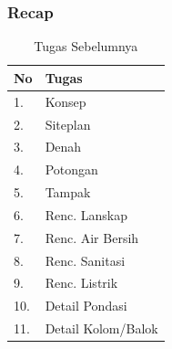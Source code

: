 \documentclass[../main.tex]{subfiles}
\begin{document}
\begin{frame}[mytitle=standard,t,mycolor=digiPH_white,light]
	\frametitle{Recap}
	\begin{table}[htb]
		\caption{Tugas Sebelumnya}
		\begin{tabularx}{\textwidth}{|p{1cm}|X|}
			\hline
			\textbf{No} & \textbf{Tugas}     \\ \hline
			1.          & Konsep             \\ \hline
			2.          & Siteplan           \\\hline
			3.          & Denah              \\\hline
			4.          & Potongan           \\ \hline
			5.          & Tampak             \\ \hline
			6.          & Renc. Lanskap      \\ \hline
			7.          & Renc. Air Bersih   \\ \hline
			8.          & Renc. Sanitasi     \\ \hline
			9.          & Renc. Listrik      \\ \hline
			10.         & Detail Pondasi     \\ \hline
			11.         & Detail Kolom/Balok \\ \hline
		\end{tabularx}
	\end{table}
\end{frame}
\end{document}

